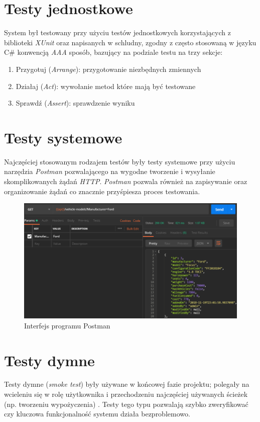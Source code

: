\documentclass[eng,printmode,openany]{mgr}
\begin{document}
	\section{Testy jednostkowe}
	System był testowany przy użyciu testów jednostkowych korzystających z biblioteki \textit{XUnit} oraz napisanych w schludny, zgodny z często stosowaną w języku C\# konwencją \textit{AAA} sposób, bazujący na podziale testu na trzy sekcje:
	\begin{enumerate}
		\item Przygotuj (\textit{Arrange}): przygotowanie niezbędnych zmiennych
		\item Działaj (\textit{Act}): wywołanie metod które mają być testowane 
		\item Sprawdź (\textit{Assert}): sprawdzenie wyniku 
	\end{enumerate}
	
	
	
	\section{Testy systemowe}
	Najczęściej stosowanym rodzajem testów były testy systemowe przy użyciu narzędzia \textit{Postman} pozwalającego na wygodne tworzenie i wysyłanie skomplikowanych żądań \textit{HTTP}. \textit{Postman} pozwala również na zapisywanie oraz organizowanie żądań co znacznie przyśpiesza proces testowania.
	\begin{figure}[H]
		\centering
		\includegraphics[width=\textwidth]{images/tests_postman.png}
		\caption{Interfejs programu Postman}
	\end{figure}

	\section{Testy dymne}
	Testy dymne (\textit{smoke test}) były używane w końcowej fazie projektu; polegały na wcieleniu się w rolę użytkownika i przechodzeniu najczęściej używanych ścieżek (np. tworzeniu wypożyczenia) . Testy tego typu pozwalają szybko zweryfikować czy kluczowa funkcjonalność systemu działa bezproblemowo.
	
\end{document}
